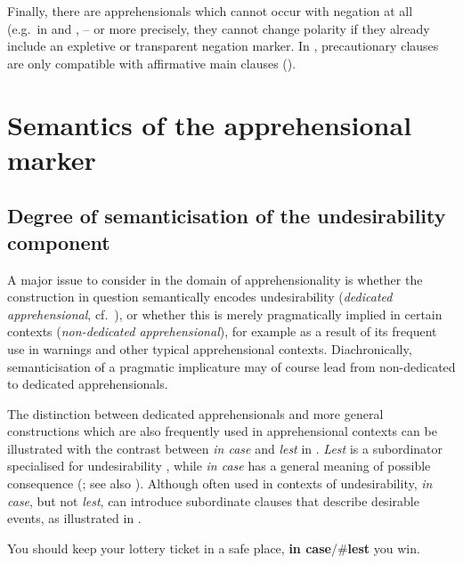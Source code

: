 \documentclass[output=paper,colorlinks,citecolor=brown]{langscibook}
\begin{document}
Finally, there are apprehensionals which cannot occur with negation at all (e.g.\ in  and ,  -- or more precisely, they cannot change polarity if they already include an expletive or transparent negation marker. In , precautionary clauses are only compatible with affirmative main clauses (\citealt{chapters/lovick}).



\section{Semantics of the apprehensional marker}
\label{sec:semantics}

\subsection{Degree of semanticisation of the undesirability component}
\label{subsec:undesirability}


A major issue to consider in the domain of apprehensionality is whether the construction in question semantically encodes undesirability (\textit{dedicated apprehensional}, cf.\ ), or whether this is merely pragmatically implied in certain contexts (\textit{non-dedicated apprehensional}), for example as a result of its frequent use in warnings and other typical apprehensional contexts. Diachronically, semanticisation of a pragmatic implicature may of course lead from non-dedicated to dedicated apprehensionals.

The distinction between dedicated apprehensionals and more general constructions which are also frequently used in apprehensional contexts can be illustrated with the contrast between \textit{in case} and \textit{lest} in . \textit{Lest} is a subordinator specialised for undesirability \citep{lópezcouso2007}, while \textit{in case} has a general meaning of possible consequence (\cite[23--25]{dixon2009}; see also ). Although often used in contexts of undesirability, \textit{in case}, but not \textit{lest}, can introduce subordinate clauses that describe desirable events, as illustrated in .

\ea\label{ex:intro14} You should keep your lottery ticket in a safe place, \textbf{in case}/\#\textbf{lest} you win.
\z
\end{document}
